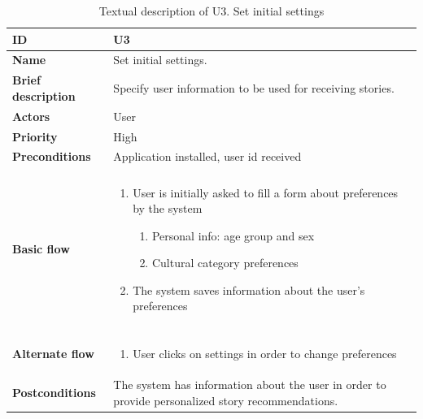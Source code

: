 \begin{table}[hp]
	\renewcommand{\arraystretch}{1.5}
	\centering
	\caption{Textual description of U3. Set initial settings}
	\begin{tabular}[b]{|l | p{13cm}|}\hline
		\textbf{ID} 				& U3									\\\hline
		\textbf{Name} 				& Set initial settings.					\\\hline
		\textbf{Brief description}	& Specify user information to be used for receiving stories. \\\hline
		\textbf{Actors} 			& User									\\\hline
		\textbf{Priority}			& High									\\\hline
		\textbf{Preconditions}		& Application installed, user id received				\\\hline&\\[-2ex]
		\textbf{Basic flow}			& \begin{minipage}{5in}
			\begin{enumerate}[noitemsep]
				\item User is initially asked to fill a form about preferences by the system
					\begin{enumerate}
						\item Personal info: age group and sex
						\item Cultural category preferences
					\end{enumerate}
				\item The system saves information about the user’s preferences
			\end{enumerate}						
		\end{minipage}						\\\hline&\\[-2ex]
		\textbf{Alternate flow}		& \begin{minipage}{5in}
			\begin{enumerate}[noitemsep]
				\item User clicks on settings in order to change preferences
			\end{enumerate}
		\end{minipage}							\\\hline
		\textbf{Postconditions}		& The system has information about the user in order to provide personalized story recommendations.\\\hline
	\end{tabular}
	\label{Tab:U3}
\end{table}

